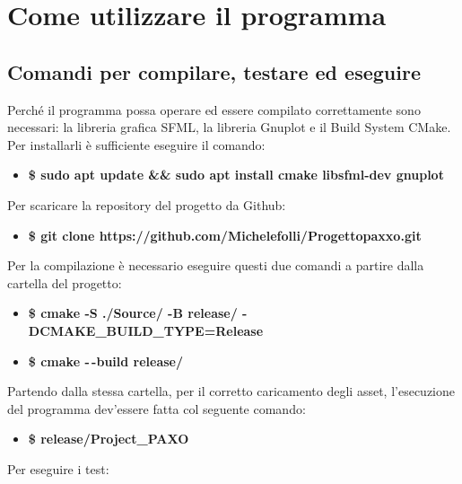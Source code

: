 \documentclass{article}
\begin{document}
\section{Come utilizzare il programma}

\subsection{Comandi per compilare, testare ed eseguire}

Perché il programma possa operare ed essere compilato correttamente sono necessari: la libreria grafica SFML, la libreria Gnuplot e il Build System CMake. Per installarli è sufficiente eseguire il comando:
\begin{itemize}
    \item \textbf{\$ sudo apt update \&\& sudo apt install cmake libsfml-dev gnuplot}
\end{itemize}

\begin{flushleft}
    Per scaricare la repository del progetto da Github:
\end{flushleft}

\begin{itemize}
    \item \textbf{\$ git clone https://github.com/Michelefolli/Progettopaxxo.git}
\end{itemize}

\begin{flushleft}
Per la compilazione è necessario eseguire questi due comandi a partire dalla cartella del progetto:
\end{flushleft}

\begin{itemize}
    \item  \textbf{\$ cmake -S ./Source/ -B release/ -DCMAKE\_BUILD\_TYPE=Release}
    \item \textbf{\$ cmake -\,-build release/}
\end{itemize}

\begin{flushleft}
Partendo dalla stessa cartella, per il corretto caricamento degli asset, l'esecuzione del programma dev'essere fatta col seguente comando:
\end{flushleft}
\begin{itemize}
    \item \textbf{\$ release/Project\_PAXO}
\end{itemize}

\begin{flushleft}
    Per eseguire i test:
\end{flushleft}
\end{document}
